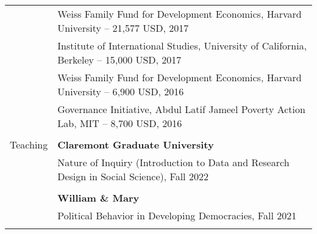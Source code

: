 \documentclass[letterpaper, 10pt]{article}
\begin{document}
\begin{longtable}{p{1.5in}p{5in}}
& Weiss Family Fund for Development Economics, Harvard University -- 21,577 USD, 2017
\\

&Institute of International Studies, University of California, Berkeley -- 15,000 USD, 2017 \\

&Weiss Family Fund for Development Economics, Harvard University -- 6,900 USD, 2016  \\

&Governance Initiative, Abdul Latif Jameel Poverty Action Lab, MIT -- 8,700 USD, 2016 \\

& \\



{{Teaching}}  & \textbf{Claremont Graduate University} \\
&Nature of Inquiry (Introduction to Data and Research Design in Social Science), Fall 2022 \\
&\\

& \textbf{William \& Mary} \\
&Political Behavior in Developing Democracies, Fall 2021 \\


&\\












\end{longtable}
\end{document}
